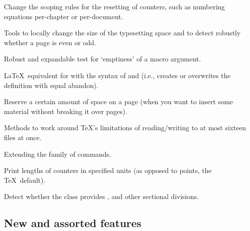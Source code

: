 \documentclass{ltugboat}
\begin{document}
\begin{description}[font=\normalfont\sffamily]
\item [chngcntr] Change the scoping rules for the resetting of counters, such as numbering equations per-chapter or per-document.
\item [chngpage \& changepage] Tools to locally change the size of the typesetting space and to detect robustly whether a page is even or odd.
\item [ifmtarg] Robust and expandable test for `emptiness' of a macro argument.
\item [makecmds] \LaTeX\ equivalent for  with the syntax of  and  (i.e., creates or overwrites the definition with equal abandon).
\item [needspace] Reserve a certain amount of space on a page (when you want to insert some material without breaking it over pages).
\item [newfile]  Methods to work around \TeX's limitations of reading/writing to at most sixteen files at once.
\item [nextpage] Extending the family of  commands.
\item [printlen] Print lengths of counters in specified units (as opposed to points, the \TeX\ default).
\item [stdclsdv] Detect whether the class provides , and other sectional divisions.
\end{description}

\subsection{New and assorted features}
\end{document}
